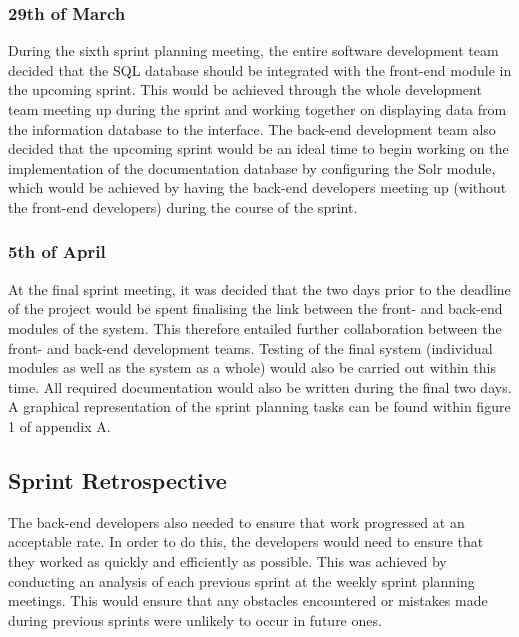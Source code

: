 \documentclass[journal]{IEEEtran}
\begin{document}
\subsubsection{29th of March}

During the sixth sprint planning meeting, the entire software development team decided that the SQL database should be integrated with the front-end module in the upcoming sprint. This would be achieved through the whole development team meeting up during the sprint and working together on displaying data from the information database to the interface. The back-end development team also decided that the upcoming sprint would be an ideal time to begin working on the implementation of the documentation database by configuring the Solr module, which would be achieved by having the back-end developers meeting up (without the front-end developers) during the course of the sprint.
\\

\subsubsection{5th of April}

At the final sprint meeting, it was decided that the two days prior to the deadline of the project would be spent finalising the link between the front- and back-end modules of the system. This therefore entailed further collaboration between the front- and back-end development teams. Testing of the final system (individual modules as well as the system as a whole) would also be carried out within this time. All required documentation would also be written during the final two days. \\

A graphical representation of the sprint planning tasks can be found within figure 1 of appendix A.


\subsection{Sprint Retrospective}

The back-end developers also needed to ensure that work progressed at an acceptable rate. In order to do this, the developers would need to ensure that they worked as quickly and efficiently as possible. This was achieved by conducting an analysis of each previous sprint at the weekly sprint planning meetings. This would ensure that any obstacles encountered or mistakes made during previous sprints were unlikely to occur in future ones. \\
\end{document}
